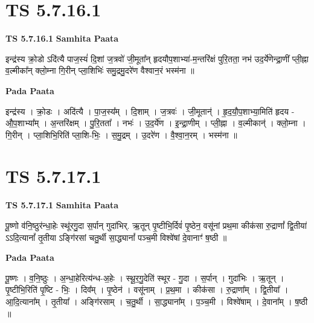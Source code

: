 \documentclass[17pt]{extarticle}
\begin{document}
\section*{ TS 5.7.16.1 }

\textbf{TS 5.7.16.1 } \newline
\textbf{Samhita Paata} \newline

इन्द्र॑स्य क्रो॒डो ऽदि॑त्यै पाज॒स्यं॑ दि॒शां ज॒त्रवो॑ जी॒मूता᳚न् हृदयौप॒शाभ्या॑-म॒न्तरि॑क्षं पुरि॒तता॒ नभ॑ उद॒र्ये॑णेन्द्रा॒णीं प्ली॒ह्ना व॒ल्मीका᳚न् क्लो॒म्ना गि॒रीन् प्ला॒शिभिः॑ समु॒द्रमु॒दरे॑ण वैश्वान॒रं भस्म॑ना ॥ \newline

\textbf{Pada Paata} \newline

इन्द्र॑स्य । क्रो॒डः । अदि॑त्यै । पा॒ज॒स्य᳚म् । दि॒शाम् । ज॒त्रवः॑ । जी॒मूतान्॑ । हृ॒द॒यौ॒प॒शाभ्या॒मिति॑ हृदय - औ॒प॒शाभ्या᳚म् । अ॒न्तरि॑क्षम् । पु॒रि॒तता᳚ । नभः॑ । उ॒द॒र्ये॑ण । इ॒न्द्रा॒णीम् । प्ली॒ह्ना । व॒ल्मीकान्॑ । क्लो॒म्ना । गि॒रीन् । प्ला॒शिभि॒रिति॑ प्ला॒शि-भिः॒ । स॒मु॒द्रम् । उ॒दरे॑ण । वै॒श्वा॒न॒रम् । भस्म॑ना ॥  \newline




\section*{ TS 5.7.17.1 }

\textbf{TS 5.7.17.1 } \newline
\textbf{Samhita Paata} \newline

पू॒ष्णो व॑नि॒ष्ठुर॑न्धा॒हेः स्थू॑रगु॒दा स॒र्पान् गुदा॑भिर्. ऋ॒तून् पृ॒ष्टीभि॒र्दिवं॑ पृ॒ष्ठेन॒ वसू॑नां प्रथ॒मा कीक॑सा रु॒द्राणां᳚ द्वि॒तीया॑ ऽऽदि॒त्यानां᳚ तृ॒तीया ऽङ्गि॑रसां चतु॒र्थी सा॒द्ध्यानां᳚ पञ्च॒मी विश्वे॑षां दे॒वानाꣳ॑ ष॒ष्ठी ॥ \newline

\textbf{Pada Paata} \newline

पू॒ष्णः । व॒नि॒ष्ठुः । अ॒न्धा॒हेरित्य॑न्ध-अ॒हेः । स्थू॒र॒गु॒देति॑ स्थूर - गु॒दा । स॒र्पान् । गुदा॑भिः । ऋ॒तून् । पृ॒ष्टीभि॒रिति॑ पृ॒ष्टि - भिः॒ । दिव᳚म् । पृ॒ष्ठेन॑ । वसू॑नाम् । प्र॒थ॒मा । कीक॑सा । रु॒द्राणा᳚म् । द्वि॒तीया᳚ । आ॒दि॒त्याना᳚म् । तृ॒तीया᳚ । अङ्गि॑रसाम् । च॒तु॒र्थी । सा॒द्ध्याना᳚म् । प॒ञ्च॒मी । विश्वे॑षाम् । दे॒वाना᳚म् । ष॒ष्ठी ॥  \newline
\end{document}
